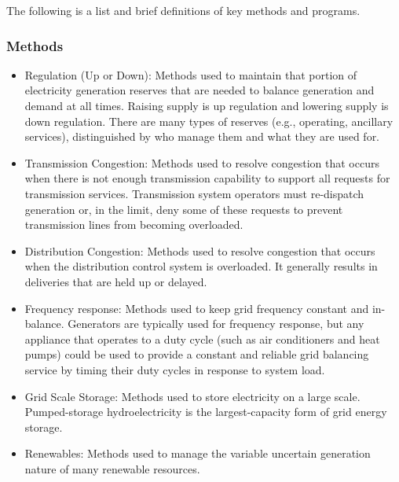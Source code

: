 The following is a list and brief definitions of key methods and programs.  

\subsubsection{Methods}
\begin{itemize}
\item Regulation (Up or Down): Methods used to maintain that portion of electricity generation reserves 
that are needed to balance generation and demand at all times.  Raising supply is up regulation and lowering 
supply is down regulation. There are many types of reserves 
(e.g., operating, ancillary services), distinguished by who manage them and what they are used for.
\item Transmission Congestion: Methods used to resolve congestion that occurs when there is not enough 
transmission capability to support all requests for transmission services. Transmission system operators 
must re-dispatch generation or, 
in the limit, deny some of these requests to prevent transmission lines from becoming overloaded.
\item Distribution Congestion:  Methods used to resolve congestion that occurs when the distribution control system 
is overloaded.  It generally results in deliveries that are held up or delayed.  
\item Frequency response:  Methods used to keep grid frequency constant and in-balance. 
Generators are typically used for frequency response, but any appliance that operates to a duty cycle 
(such as air conditioners and heat pumps) could be used to provide a 
constant and reliable grid balancing service by timing their duty cycles in response to system load.   
\item Grid Scale Storage:  Methods used to store electricity on a large scale. 
Pumped-storage hydroelectricity is the largest-capacity form of grid energy storage. 
\item Renewables:  Methods used to manage the variable uncertain generation nature of many renewable resources. 
\end{itemize}

